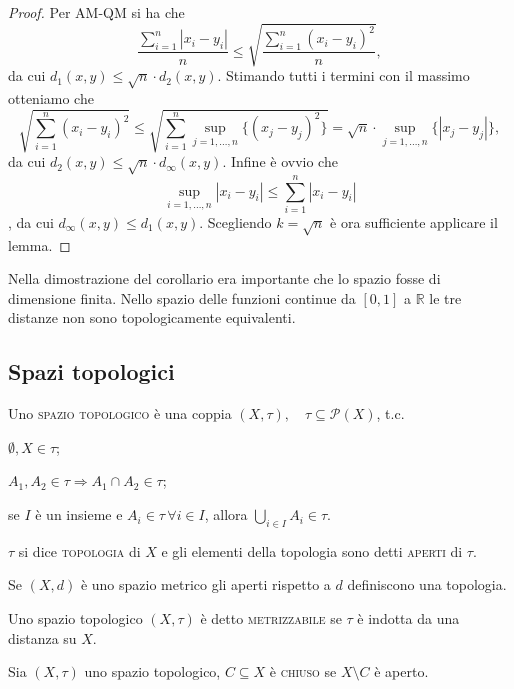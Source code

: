 \documentclass{article}
\begin{document}
\begin{proof}
Per AM-QM si ha che
$$\displaystyle \frac{\sum_{i=1}^n |x_i-y_i|}{n} \le \sqrt{\frac{\sum_{i=1}^n
(x_i-y_i)^2}{n}},$$
da cui $d_1(x, y) \le \sqrt{n} \cdot d_2(x, y)$. Stimando tutti i termini con il
massimo otteniamo che
$$\displaystyle \sqrt{\sum_{i=1}^n (x_i-y_i)^2} \le
\sqrt{\sum_{i=1}^n \sup_{j=1, \dots, n} \{(x_j-y_j)^2\}}=\sqrt{n} \cdot
\sup_{j=1, \dots, n} \{ |x_j-y_j| \},$$
da cui
$d_2(x, y) \le \sqrt{n} \cdot d_{\infty} (x, y).$
 Infine è ovvio che
 $$\displaystyle \sup_{i=1, \dots, n} |x_i-y_i| \le
 \sum_{i=1}^n |x_i-y_i|$$, da cui $d_{\infty}(x, y) \le d_1(x, y).$
Scegliendo $k=\sqrt{n}$ è ora sufficiente applicare il lemma.
\end{proof}

Nella dimostrazione del corollario era importante che lo spazio fosse di
dimensione finita. Nello spazio delle funzioni continue da $[0, 1]$ a
$\mathbb{R}$ le tre distanze non sono topologicamente equivalenti.

\subsection{Spazi topologici}

\begin{defn}
Uno \textsc{spazio topologico} è una coppia $(X, \tau),\quad {\tau \subseteq
\mathcal{P}(X)}$, t.c.
\begin{nlist}
\item $\emptyset, X \in \tau$;
\item $A_1, A_2 \in \tau \Rightarrow A_1 \cap A_2 \in \tau$;
\item se $I$ è un insieme e $A_i \in \tau \, \forall i \in I$, allora
$\displaystyle \bigcup_{i \in I} A_i \in \tau$.
\end{nlist}
$\tau$ si dice \textsc{topologia} di $X$ e gli elementi della topologia sono
detti \textsc{aperti} di $\tau$.
\end{defn}

\begin{prop}
Se $(X, d)$ è uno spazio metrico gli aperti rispetto a $d$ definiscono una
topologia.
\end{prop}

\begin{defn}
Uno spazio topologico $(X, \tau)$ è detto \textsc{metrizzabile} se $\tau$ è
indotta da una distanza su $X$.
\end{defn}

\begin{defn}
Sia $(X, \tau)$ uno spazio topologico, $C \subseteq X$ è \textsc{chiuso} se $X
\setminus C$ è aperto.
\end{defn}
\end{document}
